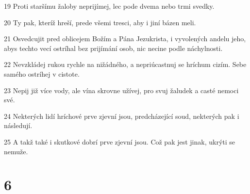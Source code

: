 \par 19 Proti staršímu žaloby neprijímej, lec pode dvema nebo trmi svedky.
\par 20 Ty pak, kteríž hreší, prede všemi tresci, aby i jiní bázen meli.
\par 21 Osvedcujit pred oblicejem Božím a Pána Jezukrista, i vyvolených andelu jeho, abys techto vecí ostríhal bez prijímání osob, nic necine podle náchylnosti.
\par 22 Nevzkládej rukou rychle na nižádného, a nepriúcastnuj se hríchum cizím. Sebe samého ostríhej v cistote.
\par 23 Nepij již více vody, ale vína skrovne užívej, pro svuj žaludek a casté nemoci své.
\par 24 Nekterých lidí hríchové prve zjevní jsou, predcházející soud, nekterých pak i následují.
\par 25 A takž také i skutkové dobrí prve zjevní jsou. Což pak jest jinak, ukrýti se nemuže.

\chapter{6}

